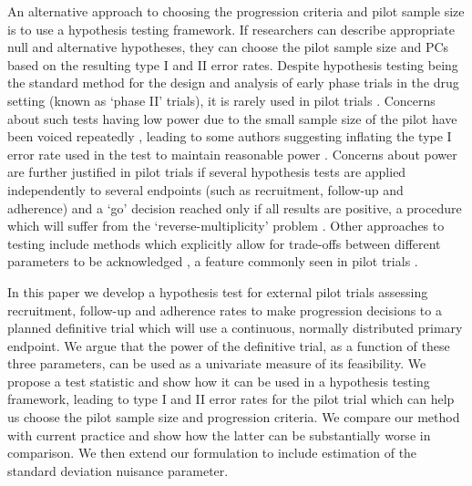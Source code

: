 \documentclass[AMA,STIX1COL]{WileyNJD-v2}
\begin{document}

An alternative approach to choosing the progression criteria and pilot sample size is to use a hypothesis testing framework. If researchers can describe appropriate null and alternative hypotheses, they can choose the pilot sample size and PCs based on the resulting type I and II error rates. Despite hypothesis testing being the standard method for the design and analysis of early phase trials in the drug setting (known as `phase II' trials), it is rarely used in pilot trials \cite{Eldridge2016a}. Concerns about such tests having low power due to the small sample size of the pilot have been voiced repeatedly \cite{Lancaster2004, Arain2010, Thabane2010, Eldridge2015}, leading to some authors suggesting inflating the type I error rate used in the test to maintain reasonable power \cite{Cocks2013, Lee2014}. Concerns about power are further justified in pilot trials if several hypothesis tests are applied independently to several endpoints (such as recruitment, follow-up and adherence) and a `go' decision reached only if all results are positive, a procedure which will suffer from the `reverse-multiplicity' problem \cite{Senn2007, Chuang-Stein2007}. Other approaches to testing include methods which explicitly allow for trade-offs between different parameters to be acknowledged \cite{Conaway1996, Thall2008}, a feature commonly seen in pilot trials \cite{Wilson2015}.

In this paper we develop a hypothesis test for external pilot trials assessing recruitment, follow-up and adherence rates to make progression decisions to a planned definitive trial which will use a continuous, normally distributed primary endpoint. We argue that the power of the definitive trial, as a function of these three parameters, can be used as a univariate measure of its feasibility. We propose a test statistic and show how it can be used in a hypothesis testing framework, leading to type I and II error rates for the pilot trial which can help us choose the pilot sample size and progression criteria. We compare our method with current practice and show how the latter can be substantially worse in comparison. We then extend our formulation to include estimation of the standard deviation nuisance parameter.
\end{document}

